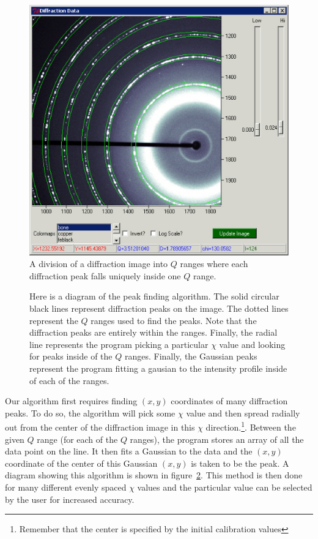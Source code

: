 \begin{figure}
    \centering
    \includegraphics[scale=.75]{figures/constant_dq_lines_on_diffraction_image.eps}
    \caption{A division of a diffraction image into
    $Q$ ranges where each diffraction peak falls 
    uniquely inside one $Q$ range.}
    \label{divide_up_image}
\end{figure}

\begin{figure}
\centering

\caption{Here is a diagram of the peak finding algorithm. 
The solid circular black lines represent diffraction
peaks on the image. The dotted lines represent the
$Q$ ranges used to find the peaks. Note that the diffraction
peaks are entirely within the ranges. Finally, the radial
line represents the program picking a particular $\chi$
value and looking for peaks inside of the $Q$ ranges.
Finally, the Gaussian peaks represent the program fitting
a gausian to the intensity profile inside of each of the
ranges.}
\label{fitting}
\end{figure}

Our algorithm first requires
finding $(x,y)$ coordinates 
of many diffraction peaks. To do so, the algorithm will 
pick some $\chi$ value and then 
spread radially out from the center of the diffraction
image in this $\chi$ direction.\footnote{Remember
that the center is specified by the initial calibration 
values}. Between the given $Q$ range (for each of the $Q$ 
ranges), the program stores an array of all the data point 
on the line. It then fits a Gaussian to the data and the
$(x,y)$ coordinate of the center of this Gaussian $(x,y)$ 
is taken to be the peak. A diagram showing this algorithm
is shown in figure~\ref{fitting}. This method is
then done for many different evenly spaced $\chi$ values
and the particular value can be selected by the user
for increased accuracy.

